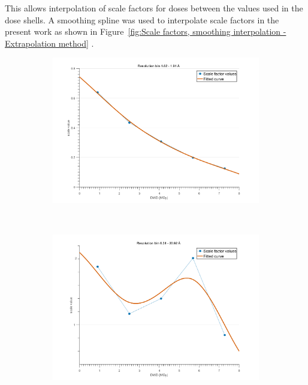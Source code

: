 This allows interpolation of scale factors for doses between the values used in the dose shells.
A smoothing spline was used to interpolate scale factors in the present work as shown in Figure~\ref{fig:Scale factors, smoothing interpolation - Extrapolation method} .
\begin{figure}
        \centering
        \begin{subfigure}[b]{1\textwidth}
                \centering
                \includegraphics[width=\textwidth]{figures/zde/scale_fit_bin12.pdf}
                \caption{}
                \label{fig:monotonic scale factor - Extrapolation method}
        \end{subfigure}
				\\
        \begin{subfigure}[b]{1\textwidth}
                \centering
                \includegraphics[width=\textwidth]{figures/zde/scale_fit_bin1.pdf}

\end{subfigure}
\end{figure}
